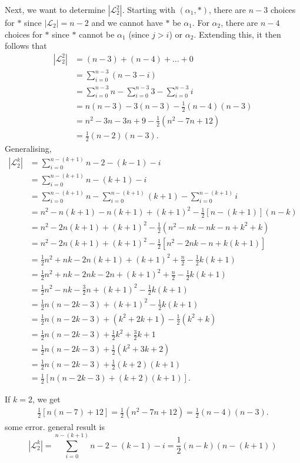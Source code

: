 \documentclass{article}
\renewcommand{\L}{\mathcal{L}}
\begin{document}
\begin{flushleft}
Next, we want to determine $\left|\L_2^2\right|$. Starting with $(\alpha_1, \ast)$, there are $n-3$
choices for $\ast$ since $|\L_2| = n-2$ and we cannot have $\ast$ be $\alpha_1$. For $\alpha_2$, 
there are $n-4$ choices for $\ast$ since $\ast$ cannot be $\alpha_1$ (since $j >i$) or $\alpha_2$.
Extending this, it then follows that 
\begin{align*}
   \left|\L_2^2\right| &= (n-3) + (n-4) + \ldots + 0 \\
                       &= \sum_{i=0}^{n-3} (n-3-i) \\
                       &= \sum_{i=0}^{n-3} n - \sum_{i=0}^{n-3} 3 - \sum_{i=0}^{n-3} i \\
                       &= n(n-3) - 3(n-3) - \frac{1}{2}(n-4)(n-3) \\
                       &= n^2 - 3n - 3n + 9 - \frac{1}{2}\left(n^2 - 7n + 12\right) \\
                       &= \frac{1}{2}(n-2)(n-3).
\end{align*}
Generalising, 
\begin{align}
   \left|\L_2^k\right| &= \sum_{i=0}^{n-(k+1)} n - 2 - (k - 1) - i \\
   &= \sum_{i=0}^{n-(k+1)} n - (k+1) - i \\
   &= \sum_{i=0}^{n-(k+1)} n - \sum_{i=0}^{n-(k+1)} (k+1) - \sum_{i=0}^{n-(k+1)} i \\
   &= n^2 - n(k+1) - n(k+1) + (k+1)^2 - \frac{1}{2}\left[n-(k+1)\right]\left(n-k\right) \\
   &= n^2 - 2n(k+1) + (k+1)^2 - \frac{1}{2}(n^2 - nk - nk - n + k^2 + k) \\
   &= n^2 - 2n(k+1) + (k+1)^2 - \frac{1}{2}\left[n^2 - 2nk - n + k(k+1)\right] \\
   &= \frac{1}{2}n^2 + nk - 2n(k+1) + (k+1)^2 + \frac{n}{2} - \frac{1}{2}k(k+1) \\
   &= \frac{1}{2}n^2 + nk - 2nk - 2n + (k+1)^2 + \frac{n}{2} - \frac{1}{2}k(k+1) \\
   &= \frac{1}{2}n^2 - nk - \frac{3}{2}n + (k+1)^2  - \frac{1}{2}k(k+1) \\
   &= \frac{1}{2}n(n - 2k - 3) + (k+1)^2  - \frac{1}{2}k(k+1) \\
   &= \frac{1}{2}n(n - 2k - 3) + (k^2 + 2k + 1)  - \frac{1}{2}(k^2 + k) \\
   &= \frac{1}{2}n(n - 2k - 3) + \frac{1}{2}k^2 + \frac{3}{2}k + 1 \\
   &= \frac{1}{2}n(n - 2k - 3) + \frac{1}{2}(k^2 + 3k + 2) \\
   &= \frac{1}{2}n(n - 2k - 3) + \frac{1}{2}(k+2)(k+1) \\
   &= \frac{1}{2}\left[n(n - 2k - 3) + (k+2)(k+1)\right].
\end{align}
\end{flushleft}
If $k=2$, we get
   \begin{align*}
      \frac{1}{2}\left[n(n-7) + 12\right] = \frac{1}{2}(n^2 - 7n + 12) = \frac{1}{2}(n-4)(n-3).
   \end{align*}
   some error. general result is 
   \[
      \left|\L_2^k\right| = \sum_{i=0}^{n-(k+1)} n - 2 - (k - 1) - i = \frac{1}{2}(n-k)(n-(k+1))
   \]
\end{document}
